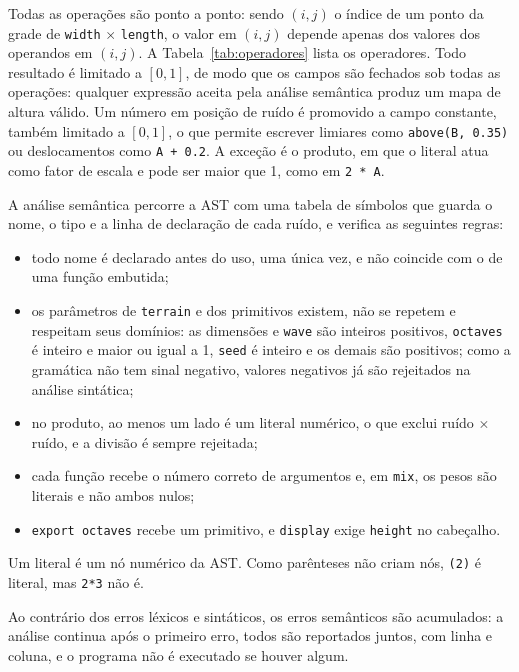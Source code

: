\documentclass[sigconf, nonacm, screen, language=portuguese, language={main=english}]{acmart}
\begin{document}
Todas as operações são ponto a ponto: sendo $(i,j)$ o índice de um
ponto da grade de \texttt{width} $\times$ \texttt{length}, o valor em
$(i,j)$ depende apenas
dos valores dos operandos em $(i,j)$. A Tabela~\ref{tab:operadores}
lista os operadores. Todo resultado é limitado a $[0,1]$, de modo que os
campos são fechados sob todas as operações: qualquer expressão aceita
pela análise semântica produz um mapa de altura válido. Um número em
posição de ruído é promovido a campo constante, também limitado a
$[0,1]$, o que permite escrever limiares como \texttt{above(B, 0.35)} ou
deslocamentos como \texttt{A + 0.2}. A exceção é o produto, em que o
literal atua como fator de escala e pode ser maior que 1, como em
\texttt{2 * A}.

A análise semântica percorre a AST com uma tabela de símbolos que
guarda o nome, o tipo e a linha de declaração de cada ruído, e verifica
as seguintes regras:
\begin{itemize}
  \item todo nome é declarado antes do uso, uma única vez, e não
        coincide com o de uma função embutida;
  \item os parâmetros de \texttt{terrain} e dos primitivos existem, não
        se repetem e respeitam seus domínios: as dimensões e
        \texttt{wave} são inteiros positivos, \texttt{octaves} é inteiro
        e maior ou igual a 1, \texttt{seed} é inteiro e os demais são
        positivos; como a gramática não tem sinal negativo, valores
        negativos já são rejeitados na análise sintática;
  \item no produto, ao menos um lado é um literal numérico, o que
        exclui ruído $\times$ ruído, e a divisão é sempre rejeitada;
  \item cada função recebe o número correto de argumentos e, em
        \texttt{mix}, os pesos são literais e não ambos nulos;
  \item \texttt{export octaves} recebe um primitivo, e
        \texttt{display} exige \texttt{height} no cabeçalho.
\end{itemize}
Um literal é um nó numérico da AST. Como parênteses não criam nós,
\texttt{(2)} é literal, mas \texttt{2*3} não é.

Ao contrário dos erros léxicos e sintáticos, os erros semânticos são
acumulados: a análise continua após o primeiro erro, todos são
reportados juntos, com linha e coluna, e o programa não é executado se
houver algum.
\end{document}
